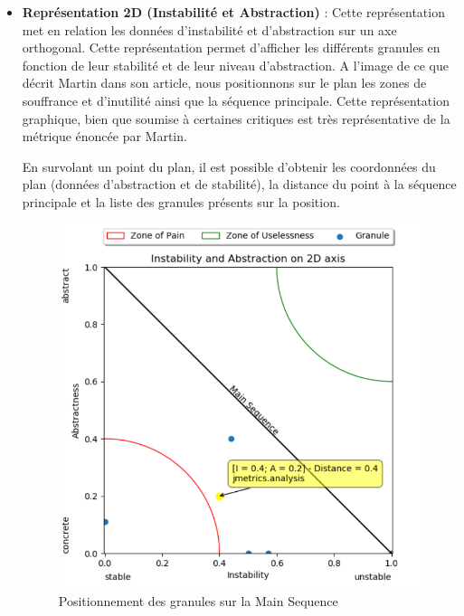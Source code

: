 \documentclass{scrartcl}
\begin{document}
\begin{itemize}
        \vspace{25mm} %
        \item \textbf{Représentation 2D (Instabilité et Abstraction)} : Cette représentation met en relation les données d'instabilité et d'abstraction sur un axe orthogonal. Cette représentation permet d'afficher les différents granules en fonction de leur stabilité et de leur niveau d'abstraction. A l'image de ce que décrit Martin dans son article, nous positionnons sur le plan les zones de souffrance et d'inutilité ainsi que la séquence principale. Cette représentation graphique, bien que soumise à certaines critiques est très représentative de la métrique énoncée par Martin.
        
        En survolant un point du plan, il est possible d'obtenir les coordonnées du plan (données d'abstraction et de stabilité), la distance du point à la séquence principale et la liste des granules présents sur la position.
        \begin{figure}[h!]
            \centering
            \includegraphics[scale=0.59]{img/plot/2Daxis_insta_abs.png}
            \caption{Positionnement des granules sur la Main Sequence}
        \end{figure}
        

\end{itemize}
\end{document}
